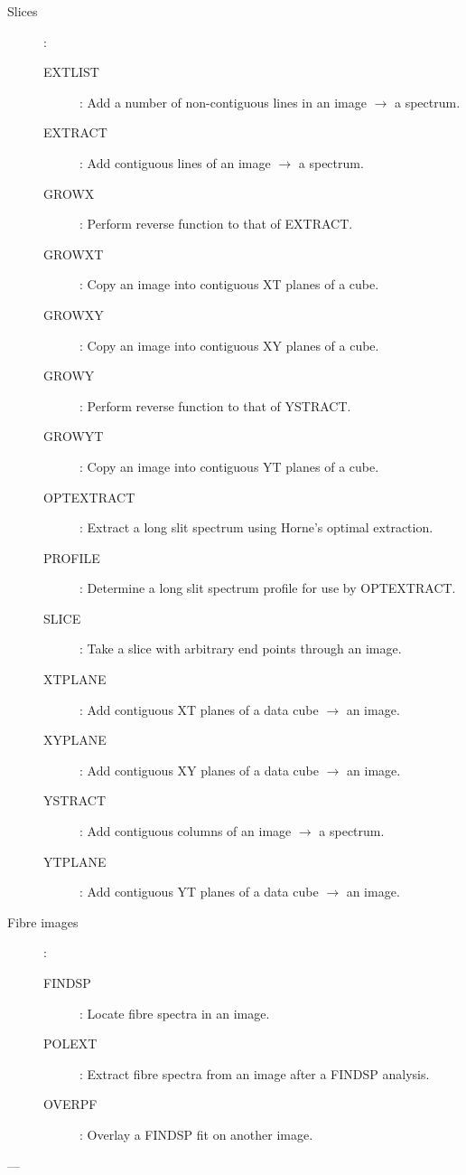 \begin {description}
\begin{description}
\item [Slices]\hspace{-1.5mm}:
\begin{description}
\item [EXTLIST]: Add a number of non-contiguous lines in an image $\rightarrow$  a spectrum.
\item [EXTRACT]: Add contiguous lines of an image $\rightarrow$  a spectrum.
\item [GROWX]: Perform reverse function to that of EXTRACT.
\item [GROWXT]: Copy an image into contiguous XT planes of a cube.
\item [GROWXY]: Copy an image into contiguous XY planes of a cube.
\item [GROWY]: Perform reverse function to that of YSTRACT.
\item [GROWYT]: Copy an image into contiguous YT planes of a cube.
\item [OPTEXTRACT]: Extract a long slit spectrum using Horne's optimal extraction.
\item [PROFILE]: Determine a long slit spectrum profile for use by OPTEXTRACT.
\item [SLICE]: Take a slice with arbitrary end points through an image.
\item [XTPLANE]: Add contiguous XT planes of a data cube $\rightarrow$  an image.
\item [XYPLANE]: Add contiguous XY planes of a data cube $\rightarrow$  an image.
\item [YSTRACT]: Add contiguous columns of an image $\rightarrow$  a spectrum.
\item [YTPLANE]: Add contiguous YT planes of a data cube $\rightarrow$  an image.
\end{description}

\item [Fibre images]\hspace{-1.5mm}:
\begin{description}
\item [FINDSP]: Locate fibre spectra in an image.
\item [POLEXT]: Extract fibre spectra from an image after a FINDSP analysis.
\item [OVERPF]: Overlay a FINDSP fit on another image.
\end{description}
\end{description}

\item [SPECTROMETERS] ---


\end{description}

